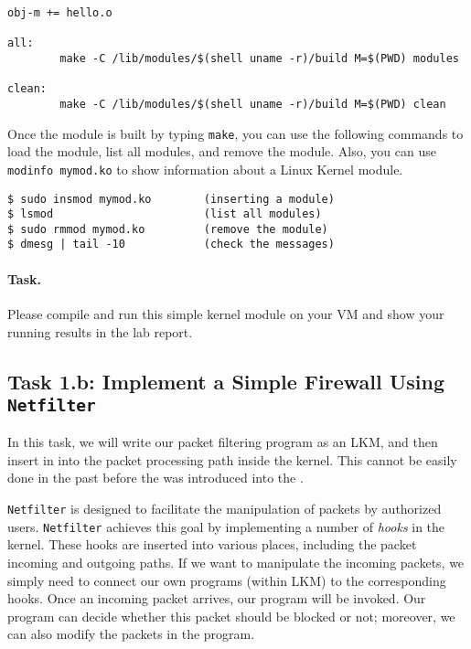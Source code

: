 \begin{lstlisting}
obj-m += hello.o

all:
        make -C /lib/modules/$(shell uname -r)/build M=$(PWD) modules

clean:
        make -C /lib/modules/$(shell uname -r)/build M=$(PWD) clean
\end{lstlisting}


Once the module is built by typing {\tt make}, you can use the following commands to 
load the module, list all modules, and remove the module. 
Also, you can use {\tt modinfo mymod.ko} to show information about a 
Linux Kernel module.

\begin{lstlisting}
$ sudo insmod mymod.ko        (inserting a module)
$ lsmod                       (list all modules)
$ sudo rmmod mymod.ko         (remove the module)
$ dmesg | tail -10            (check the messages)
\end{lstlisting}


\paragraph{Task.} Please compile and run this simple kernel module on 
your VM and show your running results in the lab report. 



\subsection{Task 1.b: Implement a Simple Firewall Using \texttt{Netfilter}}  


In this task, we will write our packet filtering program
as an LKM, and then insert in into the packet processing path
inside the kernel. This cannot be easily done in the past before 
the \Netfilter was introduced into the \linux.

{\tt Netfilter} is designed to facilitate the manipulation of 
packets by authorized users. {\tt Netfilter} achieves this 
goal by implementing a number of {\em hooks} in the 
\linux kernel. These hooks are inserted into various places, 
including the packet incoming and outgoing paths. 
If we want to manipulate the incoming packets, we simply
need to connect our own programs (within LKM) to the 
corresponding hooks. Once an incoming packet arrives, 
our program will be invoked. Our program can decide 
whether this packet should be blocked or not; moreover,
we can also modify the packets in the program.


